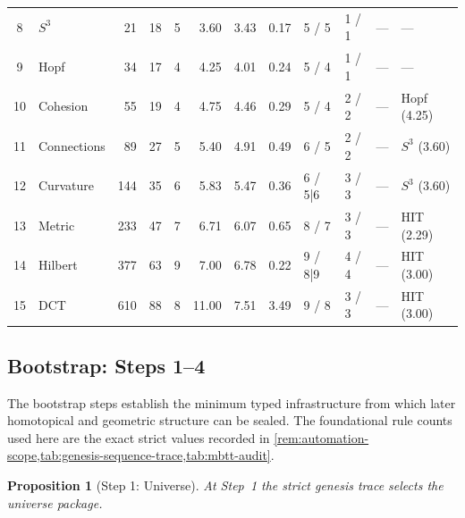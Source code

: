 \documentclass[11pt,a4paper]{article}
\theoremstyle{plain}
\newtheorem{proposition}[theorem]{Proposition}
\theoremstyle{definition}
\theoremstyle{remark}
\begin{document}
\begin{table}[tbp]
\begin{tabular}{@{}c l r r r r r r l l >{\raggedright\arraybackslash}p{1.6cm} >{\raggedright\arraybackslash}p{1.6cm}@{}}
8  & $S^3$       & 21  & 18 & 5 & 3.60 & 3.43 & 0.17 & 5 / 5   & 1 / 1      & --- & --- \\
9  & Hopf        & 34  & 17 & 4 & 4.25 & 4.01 & 0.24 & 5 / 4   & 1 / 1      & --- & --- \\
10 & Cohesion    & 55  & 19 & 4 & 4.75 & 4.46 & 0.29 & 5 / 4   & 2 / 2      & --- & Hopf (4.25) \\
11 & Connections & 89  & 27 & 5 & 5.40 & 4.91 & 0.49 & 6 / 5   & 2 / 2      & --- & $S^3$ (3.60) \\
12 & Curvature   & 144 & 35 & 6 & 5.83 & 5.47 & 0.36 & 6 / 5|6 & 3 / 3      & --- & $S^3$ (3.60) \\
13 & Metric      & 233 & 47 & 7 & 6.71 & 6.07 & 0.65 & 8 / 7   & 3 / 3      & --- & HIT (2.29) \\
14 & Hilbert     & 377 & 63 & 9 & 7.00 & 6.78 & 0.22 & 9 / 8|9 & 4 / 4      & --- & HIT (3.00) \\
15 & DCT         & 610 & 88 & 8 & 11.00 & 7.51 & 3.49 & 9 / 8   & 3 / 3      & --- & HIT (3.00) \\
\bottomrule
\end{tabular}
\end{table}

\subsection{Bootstrap: Steps 1--4}
\label{subsec:genesis-bootstrap-proof}

The bootstrap steps establish the minimum typed infrastructure from which later
homotopical and geometric structure can be sealed.
The foundational rule counts used here are the exact strict values recorded in
\cref{rem:automation-scope,tab:genesis-sequence-trace,tab:mbtt-audit}.

\begin{proposition}[Step 1: Universe]
\label{prop:genesis-step1}
At Step~1 the strict genesis trace selects the universe package.
\end{proposition}
\end{document}
